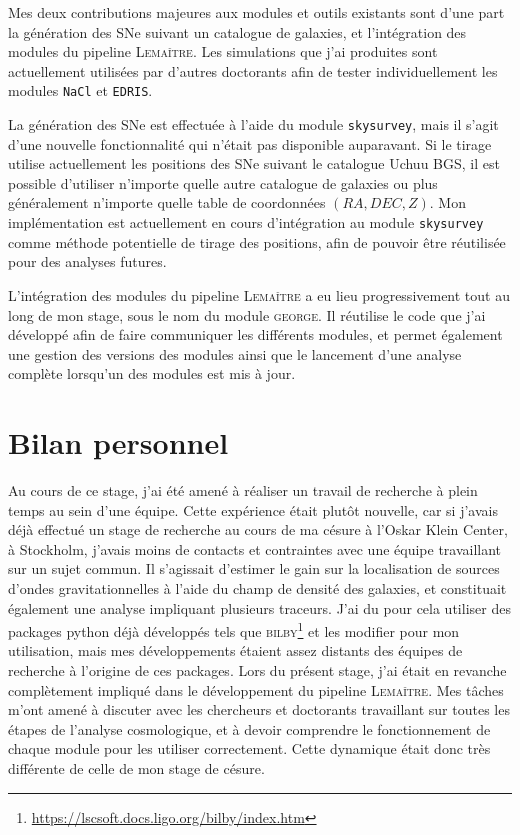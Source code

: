 \documentclass{book}
\def\lemaitre{\textsc{Lemaître}\xspace}
\def\skysurvey{\texttt{skysurvey}\xspace}
\def\nacl{\texttt{NaCl}\xspace}
\def\edris{\texttt{EDRIS}\xspace}
\begin{document}
Mes deux contributions majeures aux modules et outils existants sont d'une part la génération des SNe suivant un catalogue de galaxies, et l'intégration des modules du pipeline \lemaitre. Les simulations que j'ai produites sont actuellement utilisées par d'autres doctorants afin de tester individuellement les modules \nacl et \edris.

La génération des SNe est effectuée à l'aide du module \skysurvey, mais il s'agit d'une nouvelle fonctionnalité qui n'était pas disponible auparavant. Si le tirage utilise actuellement les positions des SNe suivant le catalogue Uchuu BGS, il est possible d'utiliser n'importe quelle autre catalogue de galaxies ou plus généralement n'importe quelle table de coordonnées $(RA,DEC,Z)$. Mon implémentation est actuellement en cours d'intégration au module \skysurvey comme méthode potentielle de tirage des positions, afin de pouvoir être réutilisée pour des analyses futures.

L'intégration des modules du pipeline \lemaitre a eu lieu progressivement tout au long de mon stage, sous le nom du module \textsc{george}. Il réutilise le code que j'ai développé afin de faire communiquer les différents modules, et permet également une gestion des versions des modules ainsi que le lancement d'une analyse complète lorsqu'un des modules est mis à jour.


\chapter{Bilan personnel}


Au cours de ce stage, j'ai été amené à réaliser un travail de recherche à plein temps au sein d'une équipe. Cette expérience était plutôt nouvelle, car si j'avais déjà effectué un stage de recherche au cours de ma césure à l'Oskar Klein Center, à Stockholm, j'avais moins de contacts et contraintes avec une équipe travaillant sur un sujet commun. Il s'agissait d'estimer le gain sur la localisation de sources d'ondes gravitationnelles à l'aide du champ de densité des galaxies, et constituait également une analyse impliquant plusieurs traceurs. J'ai du pour cela utiliser des packages python déjà développés tels que \textsc{bilby}\footnote{\href{https://lscsoft.docs.ligo.org/bilby/index.html}{https://lscsoft.docs.ligo.org/bilby/index.htm}} et les modifier pour mon utilisation, mais mes développements étaient assez distants des équipes de recherche à l'origine de ces packages. Lors du présent stage, j'ai était en revanche complètement impliqué dans le développement du pipeline \lemaitre. Mes tâches m'ont amené à discuter avec les chercheurs et doctorants travaillant sur toutes les étapes de l'analyse cosmologique, et à devoir comprendre le fonctionnement de chaque module pour les utiliser correctement. Cette dynamique était donc très différente de celle de mon stage de césure.
\end{document}
